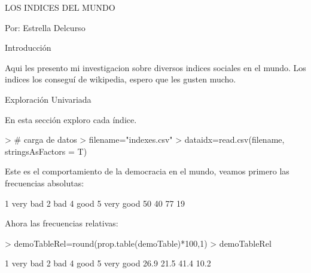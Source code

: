 \documentclass{article}
\begin{document}


LOS INDICES DEL MUNDO


Por: Estrella Delcurso


Introducción

Aqui les presento mi investigacion sobre diversos indices sociales en el mundo. Los indices los conseguí de wikipedia, espero que les gusten mucho.


Exploración Univariada

En esta sección exploro cada índice.



\begin{Schunk}
\begin{Sinput}
> # carga de datos
> filename="indexes.csv"
> dataidx=read.csv(filename, stringsAsFactors = T)
\end{Sinput}
\end{Schunk}


Este es el comportamiento de la democracia en el mundo, veamos primero las frecuencias absolutas:
\begin{Schunk}
\begin{Soutput}
 1 very bad       2 bad      4 good 5 very good 
         50          40          77          19 
\end{Soutput}
\end{Schunk}

Ahora las frecuencias relativas:
\begin{Schunk}
\begin{Sinput}
> demoTableRel=round(prop.table(demoTable)*100,1)
> demoTableRel
\end{Sinput}
\begin{Soutput}
 1 very bad       2 bad      4 good 5 very good 
       26.9        21.5        41.4        10.2 
\end{Soutput}
\end{Schunk}
\end{document}
